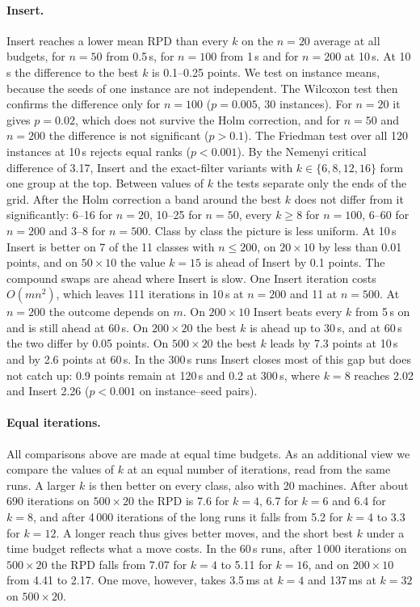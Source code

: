 \documentclass[letterpaper]{article} %
\theoremstyle{definition}
\begin{document}
\paragraph{Insert.} Insert reaches a lower mean RPD than every $k$ on the
$n=20$ average at all budgets, for $n=50$ from 0.5\,s, for $n=100$ from 1\,s and for $n=200$ at 10\,s.
At 10\,s the difference to the best $k$ is 0.1--0.25 points. We test on
instance means, because the seeds of one instance are not independent.
The Wilcoxon test then confirms the difference only for $n=100$
($p=0.005$, 30 instances). For $n=20$ it gives $p=0.02$, which does not
survive the Holm correction, and for $n=50$ and $n=200$ the difference
is not significant ($p>0.1$). The Friedman test over all 120 instances at
10\,s rejects equal ranks ($p<0.001$). By the Nemenyi critical
difference of 3.17, Insert and the exact-filter variants with
$k\in\{6,8,12,16\}$ form one group at the top. Between values of $k$
the tests separate only the ends of the grid. After the Holm correction
a band around the best $k$ does not differ from it significantly: 6--16
for $n=20$, 10--25 for $n=50$, every $k\geq 8$ for $n=100$, 6--60 for
$n=200$ and 3--8 for $n=500$. Class by class the picture is less uniform. At
10\,s Insert is better on 7 of the 11 classes with $n\leq 200$, on
$20\times 10$ by less than 0.01 points, and on $50\times 10$ the value
$k=15$ is ahead of Insert by 0.1 points. The compound swaps are ahead where Insert is slow.
One Insert iteration costs $O(mn^2)$, which leaves 111 iterations in
10\,s at $n=200$ and 11 at $n=500$. At $n=200$ the outcome depends on
$m$. On $200\times 10$ Insert beats every $k$ from 5\,s on and is still
ahead at 60\,s. On $200\times 20$ the best $k$ is ahead up to 30\,s, and
at 60\,s the two differ by 0.05 points. On $500\times 20$ the best $k$
leads by 7.3 points at 10\,s and by 2.6 points at 60\,s. In the 300\,s runs Insert closes most of
this gap but does not catch up: 0.9 points remain at 120\,s and 0.2 at
300\,s, where $k=8$ reaches 2.02 and Insert 2.26 ($p<0.001$ on
instance--seed pairs).

\paragraph{Equal iterations.} All comparisons above are made at equal
time budgets. As an additional view we compare
the values of $k$ at an equal number of iterations, read from the same
runs. A larger $k$ is then better on every class, also with 20 machines.
After about 690 iterations on $500\times 20$ the RPD is 7.6 for $k=4$,
6.7 for $k=6$ and 6.4 for $k=8$, and after 4\,000 iterations of the long
runs it falls from 5.2 for $k=4$ to 3.3 for $k=12$. A longer reach thus
gives better moves, and the short best $k$ under a time budget reflects
what a move costs. In the 60\,s runs, after 1\,000 iterations on
$500\times 20$ the RPD falls from 7.07 for $k=4$ to 5.11 for $k=16$, and
on $200\times 10$ from 4.41 to 2.17. One move, however, takes 3.5\,ms
at $k=4$ and 137\,ms at $k=32$ on $500\times 20$.
\end{document}
